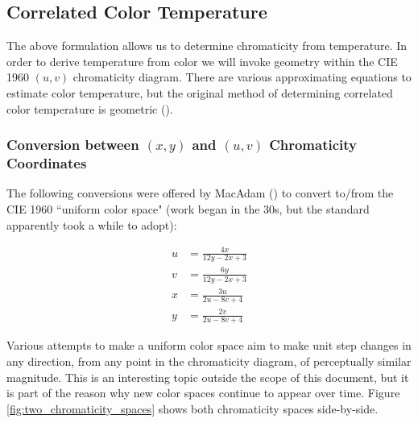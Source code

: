 \documentclass{article}
\begin{document}
\begin{multicols}{2}
\subsection{Correlated Color Temperature} %

The above formulation allows us to determine chromaticity from temperature.  In order to derive temperature from color we will invoke geometry within the CIE 1960 $(u,v)$ chromaticity diagram.  There are various approximating equations to estimate color temperature, but the original method of determining correlated color temperature is geometric (\cite{kelly1963lines}).

\subsubsection{Conversion between $(x,y)$ and $(u,v)$ Chromaticity Coordinates} %

The following conversions were offered by MacAdam (\cite{macadam1937projective}) to convert to/from the CIE 1960 ``uniform color space" (work began in the 30s, but the standard apparently took a while to adopt):

\begin{equation} %
    \begin{aligned}
        u&=\frac{4x}{12y-2x+3}\\
        v&=\frac{6y}{12y-2x+3}\\
        x&=\frac{3u}{2u-8v+4}\\
        y&=\frac{2v}{2u-8v+4}
    \end{aligned}
\end{equation}

Various attempts to make a uniform color space aim to make unit step changes in any direction, from any point in the chromaticity diagram, of perceptually similar magnitude.  This is an interesting topic outside the scope of this document, but it is part of the reason why new color spaces continue to appear over time.  Figure \ref{fig:two_chromaticity_spaces} shows both chromaticity spaces side-by-side.


\end{multicols}
\end{document}
